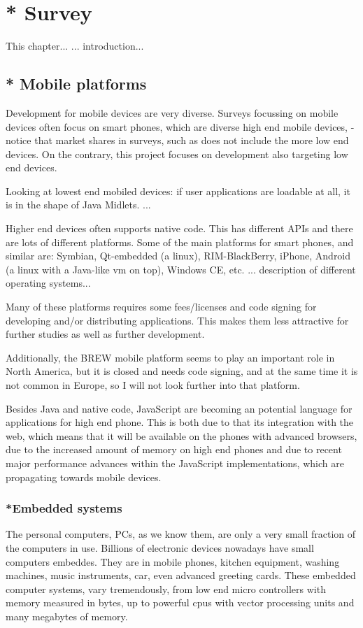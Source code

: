 \chapter{* Survey}
\label{survey}
This chapter...
... introduction...

\section{* Mobile platforms}

Development for mobile devices are very diverse.
Surveys focussing on mobile devices often focus on smart phones, which are diverse high end mobile devices, - notice that market shares in surveys, such as \cite{smartphonesurvey} does not include the more low end devices.
On the contrary, this project focuses on development also targeting low end devices.

Looking at lowest end mobiled devices: if user applications are loadable at all, it is in the shape of Java Midlets.
...

Higher end devices often supports native code.
This has different APIs and there are lots of different platforms.
Some of the main platforms for smart phones, and similar are:
Symbian, Qt-embedded (a linux), RIM-BlackBerry, iPhone, Android (a linux with a Java-like vm on top), Windows CE, etc.
... description of different operating systems...

Many of these platforms requires some fees/licenses and code signing for developing and/or distributing applications. 
This makes them less attractive for further studies as well as further development.

Additionally, the BREW mobile platform seems to play an important role in North America, but it is closed and needs code signing, and at the same time it is not common in Europe, so I will not look further into that platform.

Besides Java and native code, JavaScript are becoming an potential language for applications for high end phone. 
This is both due to that its integration with the web, which means that it will be available on the phones with advanced browsers, due to the increased amount of memory on high end phones
and due to recent major performance advances within the JavaScript implementations, which are propagating towards mobile devices.

\subsection{*Embedded systems}
The personal computers, PCs, as we know them, are only a very small fraction of the computers in use.
Billions of electronic devices nowadays have small computers embeddes. They are in mobile phones, kitchen equipment, washing machines, music instruments, car, even advanced greeting cards. 
These embedded computer systems, vary tremendously, from low end micro controllers with memory measured in bytes, up to powerful cpus with vector processing units and many megabytes of memory.

